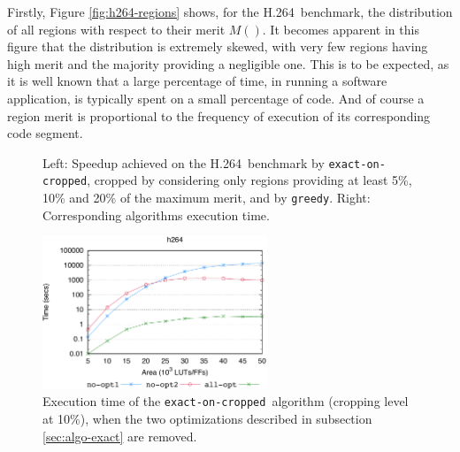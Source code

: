 \documentclass[]{usiinfthesis}
\newcommand{\htsf}{{H.264}}
\newcommand{\greedy}{\texttt{greedy}}
\newcommand{\exactC}{\texttt{exact-on-cropped}}
\begin{document}
Firstly, Figure \ref{fig:h264-regions} shows, for the \htsf\
benchmark, the distribution of all regions with respect to their merit
$M()$.
It becomes apparent in this figure that the distribution is extremely
skewed, with very few regions having high merit and the majority
providing a negligible one. This is to be expected, as it is well
known that a large percentage of time, in running a software
application, is typically spent on a small percentage of code. And of
course a region merit is proportional to the frequency of execution of
its corresponding code segment.\par

\begin{figure}[t]
\centering
\hspace*{-2cm}
\hspace*{-2cm}
\caption{Left: Speedup achieved on the \htsf\ benchmark by \exactC,
  cropped by considering only regions providing at least 5\%, 10\% and
  20\% of the maximum merit, and by \greedy.  Right: Corresponding
  algorithms execution time.}
\label{fig:h264-ex-gr}
\end{figure}

\begin{figure}[h]
\centering
\includegraphics[width=0.6\textwidth]{figs/exact_versions}
\caption{Execution time of the \exactC\ algorithm (cropping
  level at 10\%), when the two optimizations described in subsection
  \ref{sec:algo-exact} are removed.  }
\label{fig:h264-exact-versions}
\end{figure}
\end{document}
